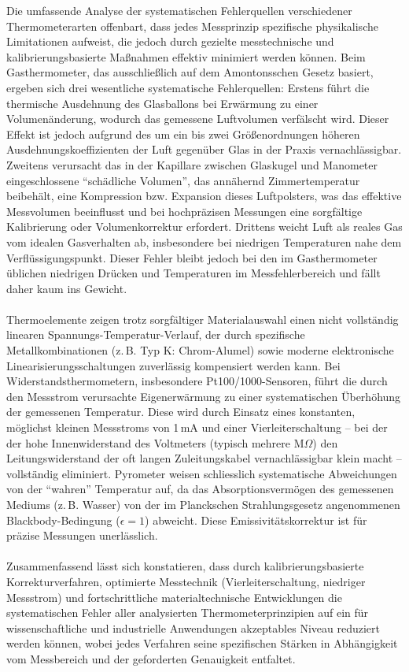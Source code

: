 \documentclass[a4paper,12pt]{article}
\begin{document}
Die umfassende Analyse der systematischen Fehlerquellen verschiedener Thermometerarten offenbart, dass jedes Messprinzip spezifische physikalische Limitationen aufweist, die jedoch durch gezielte messtechnische und kalibrierungsbasierte Maßnahmen effektiv minimiert werden können. Beim Gasthermometer, das ausschließlich auf dem Amontonsschen Gesetz basiert, ergeben sich drei wesentliche systematische Fehlerquellen: Erstens führt die thermische Ausdehnung des Glasballons bei Erwärmung zu einer Volumenänderung, wodurch das gemessene Luftvolumen verfälscht wird. Dieser Effekt ist jedoch aufgrund des um ein bis zwei Größenordnungen höheren Ausdehnungskoeffizienten der Luft gegenüber Glas in der Praxis vernachlässigbar. Zweitens verursacht das in der Kapillare zwischen Glaskugel und Manometer eingeschlossene ``schädliche Volumen'', das annähernd Zimmertemperatur beibehält, eine Kompression bzw. Expansion dieses Luftpolsters, was das effektive Messvolumen beeinflusst und bei hochpräzisen Messungen eine sorgfältige Kalibrierung oder Volumenkorrektur erfordert. Drittens weicht Luft als reales Gas vom idealen Gasverhalten ab, insbesondere bei niedrigen Temperaturen nahe dem Verflüssigungspunkt. Dieser Fehler bleibt jedoch bei den im Gasthermometer üblichen niedrigen Drücken und Temperaturen im Messfehlerbereich und fällt daher kaum ins Gewicht. \\\\
Thermoelemente zeigen trotz sorgfältiger Materialauswahl einen nicht vollständig linearen Spannungs-Temperatur-Verlauf, der durch spezifische Metallkombinationen (z.\,B. Typ K: Chrom-Alumel) sowie moderne elektronische Linearisierungsschaltungen zuverlässig kompensiert werden kann. Bei Widerstandsthermometern, insbesondere Pt100/1000-Sensoren, führt die durch den Messstrom verursachte Eigenerwärmung zu einer systematischen Überhöhung der gemessenen Temperatur. Diese wird durch Einsatz eines konstanten, möglichst kleinen Messstroms von 1\,mA und einer Vierleiterschaltung -- bei der der hohe Innenwiderstand des Voltmeters (typisch mehrere M$\Omega$) den Leitungswiderstand der oft langen Zuleitungskabel vernachlässigbar klein macht -- vollständig eliminiert. Pyrometer weisen schliesslich systematische Abweichungen von der ``wahren'' Temperatur auf, da das Absorptionsvermögen des gemessenen Mediums (z.\,B. Wasser) von der im Planckschen Strahlungsgesetz angenommenen Blackbody-Bedingung ($\epsilon=1$) abweicht. Diese Emissivitätskorrektur ist für präzise Messungen unerlässlich. \\\\
Zusammenfassend lässt sich konstatieren, dass durch kalibrierungsbasierte Korrekturverfahren, optimierte Messtechnik (Vierleiterschaltung, niedriger Messstrom) und fortschrittliche materialtechnische Entwicklungen die systematischen Fehler aller analysierten Thermometerprinzipien auf ein für wissenschaftliche und industrielle Anwendungen akzeptables Niveau reduziert werden können, wobei jedes Verfahren seine spezifischen Stärken in Abhängigkeit vom Messbereich und der geforderten Genauigkeit entfaltet.

\end{document}
